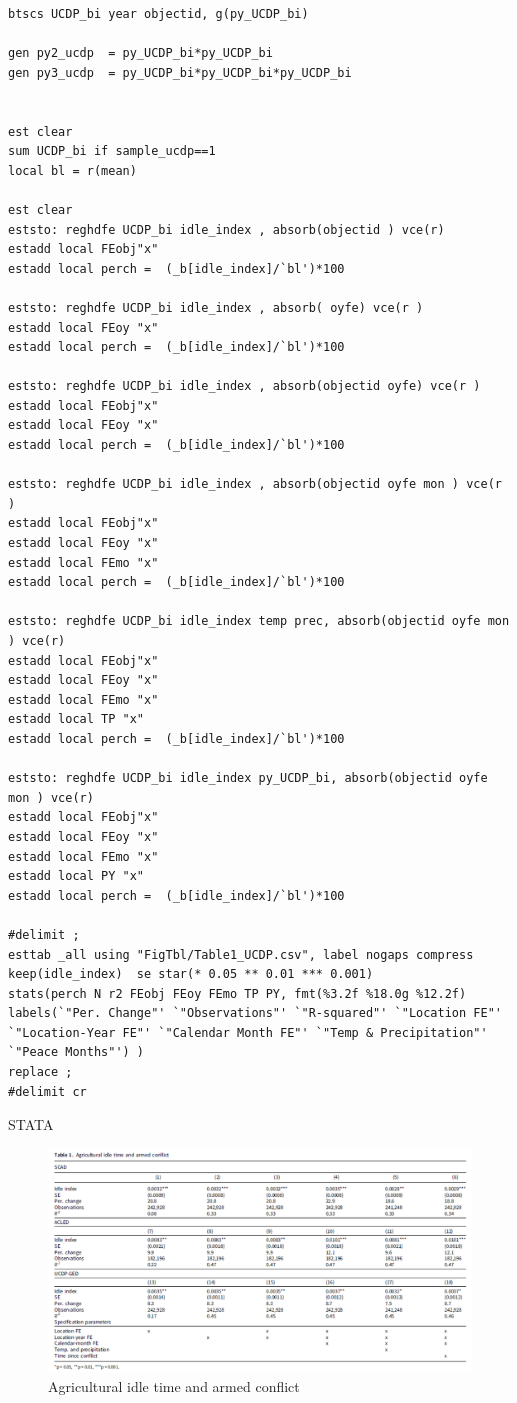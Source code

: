 \documentclass[12pt,letterpaper]{article}
\begin{document}
\begin{lstlisting}
btscs UCDP_bi year objectid, g(py_UCDP_bi)

gen py2_ucdp  = py_UCDP_bi*py_UCDP_bi
gen py3_ucdp  = py_UCDP_bi*py_UCDP_bi*py_UCDP_bi


est clear 
sum UCDP_bi if sample_ucdp==1 
local bl = r(mean) 

est clear
eststo: reghdfe UCDP_bi idle_index , absorb(objectid ) vce(r)  
estadd local FEobj"x"
estadd local perch =  (_b[idle_index]/`bl')*100

eststo: reghdfe UCDP_bi idle_index , absorb( oyfe) vce(r )  
estadd local FEoy "x"
estadd local perch =  (_b[idle_index]/`bl')*100

eststo: reghdfe UCDP_bi idle_index , absorb(objectid oyfe) vce(r )  
estadd local FEobj"x"
estadd local FEoy "x"
estadd local perch =  (_b[idle_index]/`bl')*100

eststo: reghdfe UCDP_bi idle_index , absorb(objectid oyfe mon ) vce(r )  
estadd local FEobj"x"
estadd local FEoy "x"
estadd local FEmo "x"
estadd local perch =  (_b[idle_index]/`bl')*100

eststo: reghdfe UCDP_bi idle_index temp prec, absorb(objectid oyfe mon ) vce(r)  
estadd local FEobj"x"
estadd local FEoy "x"
estadd local FEmo "x"
estadd local TP "x"
estadd local perch =  (_b[idle_index]/`bl')*100

eststo: reghdfe UCDP_bi idle_index py_UCDP_bi, absorb(objectid oyfe mon ) vce(r)  
estadd local FEobj"x"
estadd local FEoy "x"
estadd local FEmo "x"
estadd local PY "x"
estadd local perch =  (_b[idle_index]/`bl')*100

#delimit ; 
esttab _all using "FigTbl/Table1_UCDP.csv", label nogaps compress 
keep(idle_index)  se star(* 0.05 ** 0.01 *** 0.001) 
stats(perch N r2 FEobj FEoy FEmo TP PY, fmt(%3.2f %18.0g %12.2f) labels(`"Per. Change"' `"Observations"' `"R-squared"' `"Location FE"' `"Location-Year FE"' `"Calendar Month FE"' `"Temp & Precipitation"' `"Peace Months"') )
replace ; 
#delimit cr 

\end{lstlisting}

\newpage
STATA
\begin{figure}[htbp]
	\centering
	\includegraphics[width=1.0\textwidth]{Table 1 Agricultural idle time and armed conflict.png}
	\caption{Agricultural idle time and armed conflict}
	\label{fig:agri_conflict}
\end{figure}
\end{document}
